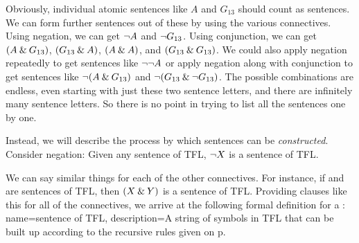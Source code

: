 Obviously, individual atomic sentences like $A$ and $G_{13}$ should count as sentences. We can form further sentences out of these by using the various connectives. Using negation, we can get $\neg A$ and $\neg G_{13}$. Using conjunction, we can get $(A \mathbin{\&} G_{13})$, $(G_{13} \mathbin{\&} A)$, $(A \mathbin{\&} A)$, and $(G_{13} \mathbin{\&} G_{13})$. We could also apply negation repeatedly to get sentences like $\neg \neg A$ or apply negation along with conjunction to get sentences like $\neg(A \mathbin{\&} G_{13})$ and $\neg(G_{13} \mathbin{\&} \neg G_{13})$. The possible combinations are endless, even starting with just these two sentence letters, and there are infinitely many sentence letters. So there is no point in trying to list all the sentences one by one.

Instead, we will describe the process by which sentences can be \emph{constructed}. Consider negation: Given any sentence \metaX of TFL, $\neg X$ is a sentence of TFL. 

We can say similar things for each of the other connectives. For instance, if \metaX and \metaY are sentences of TFL, then $(X\mathbin{\&}Y)$ is a sentence of TFL. Providing clauses like this for all of the connectives, we arrive at the following formal definition for a :
{
name=sentence of TFL,
description={A string of symbols in TFL that can be built up according to the recursive rules given on p.~\pageref{TFLsentences}}
}

